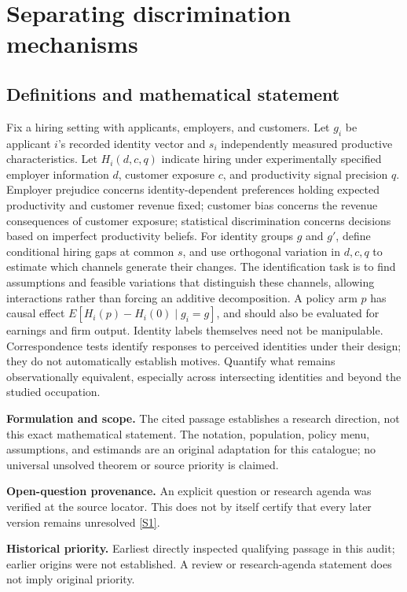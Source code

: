 \documentclass[11pt]{article}
\newcommand{\sref}[2]{\hyperlink{source:#1:#2}{[S#2]}}
\begin{document}
\section*{Separating discrimination mechanisms}\label{30007638}
\subsection{Definitions and mathematical statement}
Fix a hiring setting with applicants, employers, and customers. Let \(g_i\) be applicant \(i\)'s recorded identity vector and \(s_i\) independently measured productive characteristics. Let \(H_i(d,c,q)\) indicate hiring under experimentally specified employer information \(d\), customer exposure \(c\), and productivity signal precision \(q\). Employer prejudice concerns identity-dependent preferences holding expected productivity and customer revenue fixed; customer bias concerns the revenue consequences of customer exposure; statistical discrimination concerns decisions based on imperfect productivity beliefs. For identity groups \(g\) and \(g'\), define conditional hiring gaps at common \(s\), and use orthogonal variation in \(d,c,q\) to estimate which channels generate their changes. The identification task is to find assumptions and feasible variations that distinguish these channels, allowing interactions rather than forcing an additive decomposition. A policy arm \(p\) has causal effect \(E[H_i(p)-H_i(0)\mid g_i=g]\), and should also be evaluated for earnings and firm output. Identity labels themselves need not be manipulable. Correspondence tests identify responses to perceived identities under their design; they do not automatically establish motives. Quantify what remains observationally equivalent, especially across intersecting identities and beyond the studied occupation.

\par\textbf{Formulation and scope.} The cited passage establishes a research direction, not this exact mathematical statement. The notation, population, policy menu, assumptions, and estimands are an original adaptation for this catalogue; no universal unsolved theorem or source priority is claimed.

\par\textbf{Open-question provenance.} An explicit question or research agenda was verified at the source locator. This does not by itself certify that every later version remains unresolved \sref{30007638}{1}.

\par\textbf{Historical priority.} Earliest directly inspected qualifying passage in this audit; earlier origins were not established. A review or research-agenda statement does not imply original priority.
\end{document}
